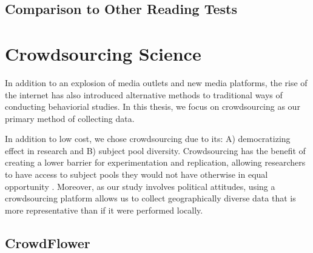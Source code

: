 \subsection{Comparison to Other Reading Tests}

\section{Crowdsourcing Science}

In addition to an explosion of media outlets and new media platforms, the rise of the internet has also introduced alternative methods to traditional ways of conducting behaviorial studies. In this thesis, we focus on crowdsourcing as our primary method of collecting data.

In addition to low cost, we chose crowdsourcing due to its: A) democratizing effect in research and B) subject pool diversity. Crowdsourcing has the benefit of creating a lower barrier for experimentation and replication, allowing researchers to have access to subject pools they would not have otherwise in equal opportunity 
\cite{mason2012conducting}. Moreover, as our study involves political attitudes, using a crowdsourcing platform allows us to collect geographically diverse data that is more representative than if it were performed locally.   

 
\subsection{CrowdFlower}









